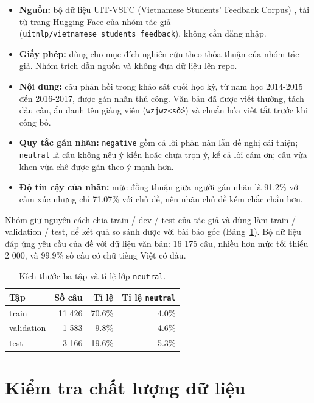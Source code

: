 \begin{itemize}
  \item \textbf{Nguồn:} bộ dữ liệu UIT-VSFC (Vietnamese Students' Feedback Corpus) \cite{text-vsfc}, tải từ trang Hugging Face
        của nhóm tác giả (\texttt{uitnlp/vietnamese\_students\_feedback}), không cần đăng nhập.
  \item \textbf{Giấy phép:} dùng cho mục đích nghiên cứu theo thỏa thuận của nhóm tác giả. Nhóm trích dẫn nguồn và không
        đưa dữ liệu lên repo.
  \item \textbf{Nội dung:} câu phản hồi trong khảo sát cuối học kỳ, từ năm học 2014-2015 đến 2016-2017, được gán nhãn thủ
        công. Văn bản đã được viết thường, tách dấu câu, ẩn danh tên giảng viên (\texttt{wzjwz<số>}) và chuẩn hóa viết tắt
        trước khi công bố.
  \item \textbf{Quy tắc gán nhãn:} \texttt{negative} gồm cả lời phàn nàn lẫn đề nghị cải thiện; \texttt{neutral} là câu
        không nêu ý kiến hoặc chưa trọn ý, kể cả lời cảm ơn; câu vừa khen vừa chê được gán theo ý mạnh hơn.
  \item \textbf{Độ tin cậy của nhãn:} mức đồng thuận giữa người gán nhãn là 91.2\% với cảm xúc nhưng chỉ 71.07\% với chủ
        đề, nên nhãn chủ đề kém chắc chắn hơn.
\end{itemize}

Nhóm giữ nguyên cách chia train / dev / test của tác giả và dùng làm train / validation / test, để kết quả so sánh được
với bài báo gốc (Bảng~\ref{tab:text-split}). Bộ dữ liệu đáp ứng yêu cầu của đề với dữ liệu văn bản: 16 175 câu, nhiều
hơn mức tối thiểu 2 000, và 99.9\% số câu có chữ tiếng Việt có dấu.

\begin{table}[H]\centering
\caption{Kích thước ba tập và tỉ lệ lớp \texttt{neutral}.}\label{tab:text-split}
\begin{tabular}{lrrr}
\toprule
Tập & Số câu & Tỉ lệ & Tỉ lệ \texttt{neutral} \\
\midrule
train & 11 426 & 70.6\% & 4.0\% \\
validation & 1 583 & 9.8\% & 4.6\% \\
test & 3 166 & 19.6\% & 5.3\% \\
\bottomrule
\end{tabular}
\end{table}

\section{Kiểm tra chất lượng dữ liệu}

